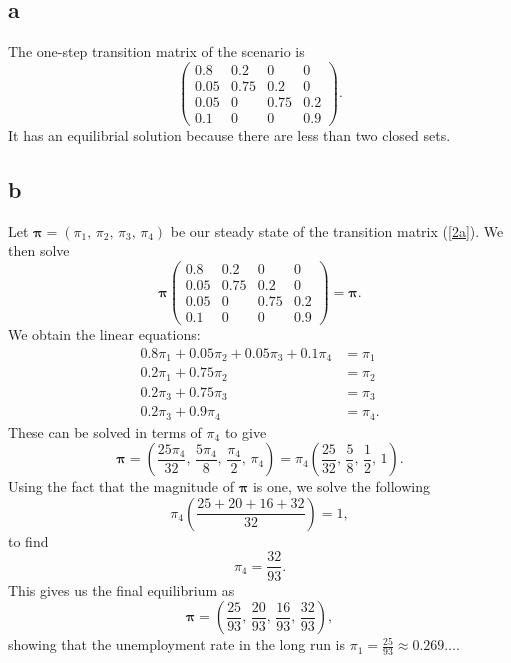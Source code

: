 \documentclass{article}
\begin{document}
\subsection{a}
The one-step transition matrix of the scenario is 
\begin{equation}
    \begin{pmatrix}
        0.8 & 0.2 & 0 & 0 \\
        0.05 & 0.75 & 0.2 & 0 \\
        0.05 & 0 & 0.75 & 0.2 \\
        0.1 & 0 & 0 & 0.9 
    \end{pmatrix}.\label{2a}
\end{equation}
It has an equilibrial solution because there are less than two closed sets.

\subsection{b}
Let $\mathbf{\pi}=(\pi_1,\,\pi_2,\,\pi_3,\,\pi_4)$ be our steady state of the transition matrix (\ref{2a}). We then solve
\begin{equation}
    \mathbf{\pi}\begin{pmatrix}
        0.8 & 0.2 & 0 & 0 \\
        0.05 & 0.75 & 0.2 & 0 \\
        0.05 & 0 & 0.75 & 0.2 \\
        0.1 & 0 & 0 & 0.9 
    \end{pmatrix} = \mathbf{\pi}.
\end{equation}
We obtain the linear equations:
\begin{align}
    0.8\pi_1 + 0.05\pi_2 + 0.05\pi_3 + 0.1\pi_4 &= \pi_1 \\
    0.2\pi_1 + 0.75\pi_2 &= \pi_2 \\
    0.2\pi_3 + 0.75\pi_3 &= \pi_3 \\
    0.2\pi_3 + 0.9\pi_4 &= \pi_4.
\end{align}
These can be solved in terms of $\pi_4$ to give
\begin{equation}
    \mathbf{\pi} = \left(\frac{25\pi_4}{32},\,\frac{5\pi_4}{8},\,\frac{\pi_4}{2},\,\pi_4\right) = \pi_4\left( \frac{25}{32},\,\frac{5}{8},\,\frac{1}{2},\,1 \right).
\end{equation}
Using the fact that the magnitude of $\mathbf{\pi}$ is one, we solve the following
\begin{equation}
    \pi_4\left( \frac{25 + 20 + 16 + 32}{32} \right) = 1,
\end{equation}
to find
\begin{equation}
    \pi_4 = \frac{32}{93}.
\end{equation}
This gives us the final equilibrium as
\begin{equation}
    \mathbf{\pi} = \left( \frac{25}{93},\,\frac{20}{93},\,\frac{16}{93},\,\frac{32}{93} \right),
\end{equation}
showing that the unemployment rate in the long run is $\pi_1 = \frac{25}{93}\approx 0.269\ldots$.
\end{document}
